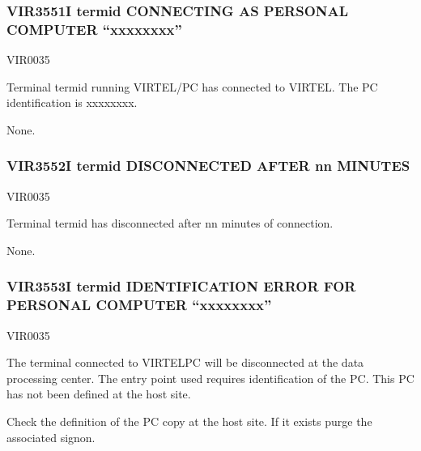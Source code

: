 \documentclass[letterpaper,10pt,english]{sphinxmanual}
\begin{document}
\subsubsection{VIR3551I termid CONNECTING AS PERSONAL COMPUTER “xxxxxxxx”}
\label{\detokenize{messages:vir3551i-termid-connecting-as-personal-computer-xxxxxxxx}}\begin{description}
\sphinxAtStartPar
VIR0035

\sphinxAtStartPar
Terminal termid running VIRTEL/PC has connected to VIRTEL. The PC identification is xxxxxxxx.

\sphinxAtStartPar
None.

\end{description}


\subsubsection{VIR3552I termid DISCONNECTED AFTER nn MINUTES}
\label{\detokenize{messages:vir3552i-termid-disconnected-after-nn-minutes}}\begin{description}
\sphinxAtStartPar
VIR0035

\sphinxAtStartPar
Terminal termid has disconnected after nn minutes of connection.

\sphinxAtStartPar
None.

\end{description}


\subsubsection{VIR3553I termid IDENTIFICATION ERROR FOR PERSONAL COMPUTER “xxxxxxxx”}
\label{\detokenize{messages:vir3553i-termid-identification-error-for-personal-computer-xxxxxxxx}}\begin{description}
\sphinxAtStartPar
VIR0035

\sphinxAtStartPar
The terminal connected to VIRTELPC will be disconnected at the data processing center. The entry point used requires identification of the PC. This PC has not been defined at the host site.

\sphinxAtStartPar
Check the definition of the PC copy at the host site. If it exists purge the associated sign\sphinxhyphen{}on.

\end{description}
\end{document}
